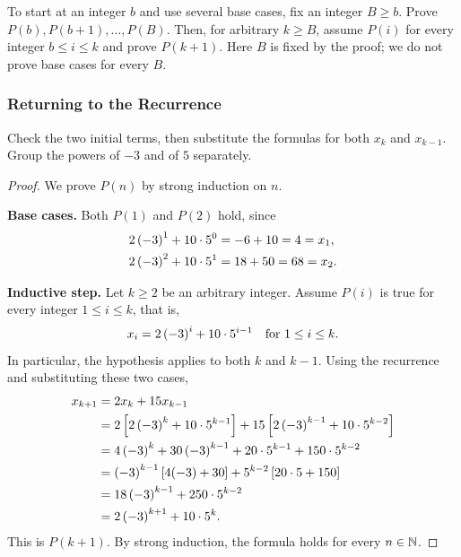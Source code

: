 To start at an integer $b$ and use several base cases, fix an integer
$B\geq b$. Prove $P(b),P(b+1),\ldots,P(B)$. Then, for arbitrary $k\geq B$,
assume $P(i)$ for every integer $b\leq i\leq k$ and prove $P(k+1)$.
Here $B$ is fixed by the proof; we do not prove base cases for every $B$.

\subsubsection{Returning to the Recurrence}
\begin{remark}
    Check the two initial terms, then substitute the formulas for both
    $x_k$ and $x_{k-1}$. Group the powers of $-3$ and of $5$ separately.
\end{remark}
\begin{proof}
    We prove $P(n)$ by strong induction on $n$.

    \textbf{Base cases.} Both $P(1)$ and $P(2)$ hold, since
    \begin{align*}
        2\left(-3\right)^1+10\cdot5^0&=-6+10=4=x_1,\\
        2\left(-3\right)^2+10\cdot5^1&=18+50=68=x_2.
    \end{align*}

    \textbf{Inductive step.} Let $k\geq2$ be an arbitrary integer.
    Assume $P(i)$ is true for every integer $1\leq i\leq k$, that is,
    \[
        x_i=2\left(-3\right)^i+10\cdot5^{i-1}
        \quad\text{for }1\leq i\leq k.
    \]
    In particular, the hypothesis applies to both $k$ and $k-1$.
    Using the recurrence and substituting these two cases,
    \begin{align*}
        x_{k+1}
        &=2x_k+15x_{k-1}\\
        &=2\left[2\left(-3\right)^k+10\cdot5^{k-1}\right]
          +15\left[2\left(-3\right)^{k-1}+10\cdot5^{k-2}\right]\\
        &=4\left(-3\right)^k+30\left(-3\right)^{k-1}
          +20\cdot5^{k-1}+150\cdot5^{k-2}\\
        &=\left(-3\right)^{k-1}\left[4(-3)+30\right]
          +5^{k-2}\left[20\cdot5+150\right]\\
        &=18\left(-3\right)^{k-1}+250\cdot5^{k-2}\\
        &=2\left(-3\right)^{k+1}+10\cdot5^k.
    \end{align*}
    This is $P(k+1)$. By strong induction, the formula holds for every
    $n\in\mathbb{N}$.
\end{proof}

